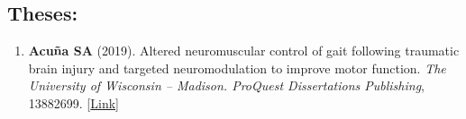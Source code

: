 \documentclass[letterpaper, 10pt]{article}
\begin{document}


\subsection{Theses:}
\begin{enumerate}
    \item \textbf{Acuña SA} (2019). Altered neuromuscular control of gait following traumatic brain injury and targeted neuromodulation to improve motor function. \textit{The University of Wisconsin -- Madison. ProQuest Dissertations Publishing}, 13882699. [\href{https://www.proquest.com/docview/2229834647}{Link}]
\end{enumerate}

\end{document}
